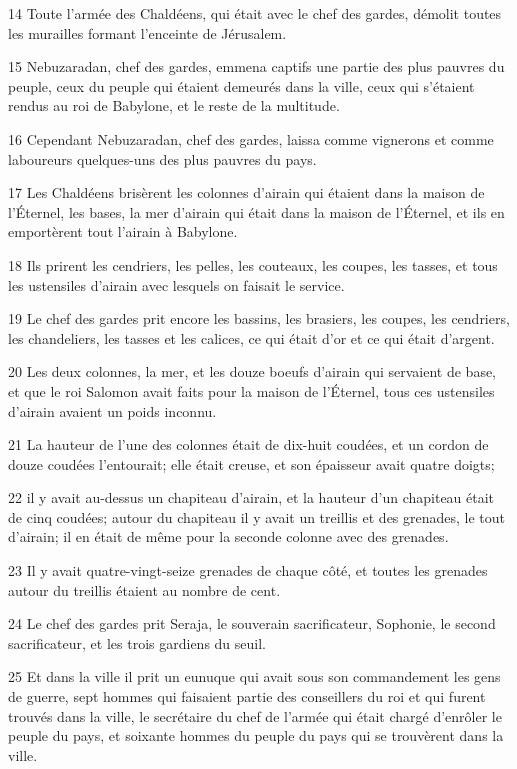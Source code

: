 \par 14 Toute l'armée des Chaldéens, qui était avec le chef des gardes, démolit toutes les murailles formant l'enceinte de Jérusalem.
\par 15 Nebuzaradan, chef des gardes, emmena captifs une partie des plus pauvres du peuple, ceux du peuple qui étaient demeurés dans la ville, ceux qui s'étaient rendus au roi de Babylone, et le reste de la multitude.
\par 16 Cependant Nebuzaradan, chef des gardes, laissa comme vignerons et comme laboureurs quelques-uns des plus pauvres du pays.
\par 17 Les Chaldéens brisèrent les colonnes d'airain qui étaient dans la maison de l'Éternel, les bases, la mer d'airain qui était dans la maison de l'Éternel, et ils en emportèrent tout l'airain à Babylone.
\par 18 Ils prirent les cendriers, les pelles, les couteaux, les coupes, les tasses, et tous les ustensiles d'airain avec lesquels on faisait le service.
\par 19 Le chef des gardes prit encore les bassins, les brasiers, les coupes, les cendriers, les chandeliers, les tasses et les calices, ce qui était d'or et ce qui était d'argent.
\par 20 Les deux colonnes, la mer, et les douze boeufs d'airain qui servaient de base, et que le roi Salomon avait faits pour la maison de l'Éternel, tous ces ustensiles d'airain avaient un poids inconnu.
\par 21 La hauteur de l'une des colonnes était de dix-huit coudées, et un cordon de douze coudées l'entourait; elle était creuse, et son épaisseur avait quatre doigts;
\par 22 il y avait au-dessus un chapiteau d'airain, et la hauteur d'un chapiteau était de cinq coudées; autour du chapiteau il y avait un treillis et des grenades, le tout d'airain; il en était de même pour la seconde colonne avec des grenades.
\par 23 Il y avait quatre-vingt-seize grenades de chaque côté, et toutes les grenades autour du treillis étaient au nombre de cent.
\par 24 Le chef des gardes prit Seraja, le souverain sacrificateur, Sophonie, le second sacrificateur, et les trois gardiens du seuil.
\par 25 Et dans la ville il prit un eunuque qui avait sous son commandement les gens de guerre, sept hommes qui faisaient partie des conseillers du roi et qui furent trouvés dans la ville, le secrétaire du chef de l'armée qui était chargé d'enrôler le peuple du pays, et soixante hommes du peuple du pays qui se trouvèrent dans la ville.
